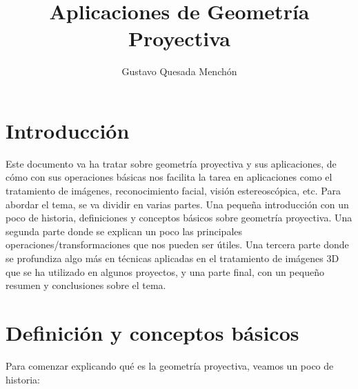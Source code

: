 \documentclass[a4,10pt]{article}
\begin{document}
\title{Aplicaciones de Geometría Proyectiva}
\author{Gustavo Quesada Menchón}
\date{}
\maketitle
\newpage

\tableofcontents
\newpage

\section{Introducción}

Este documento va ha tratar sobre geometría proyectiva y sus aplicaciones, de cómo con sus operaciones básicas nos facilita la tarea en aplicaciones como el tratamiento de imágenes, reconocimiento facial, visión estereoscópica, etc. Para abordar el tema, se va dividir en varias partes. Una pequeña introducción con un poco de historia, definiciones y conceptos básicos sobre geometría proyectiva. Una segunda parte donde se explican un poco las principales operaciones/transformaciones que nos pueden ser útiles. Una tercera parte donde se profundiza algo más en técnicas aplicadas en el tratamiento de imágenes 3D que se ha utilizado en algunos proyectos, y una parte final, con un pequeño resumen y conclusiones sobre el tema.


\section {Definición y conceptos básicos}

Para comenzar explicando qué es la geometría proyectiva, veamos un poco de historia:
\end{document}
